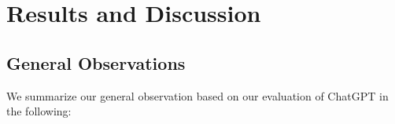 \documentclass[11pt]{article}
\begin{document}
    











       


  




    












%
 \section{Results and Discussion}

\subsection{General Observations}
We summarize our general observation based on our evaluation of ChatGPT in the following:
\end{document}

